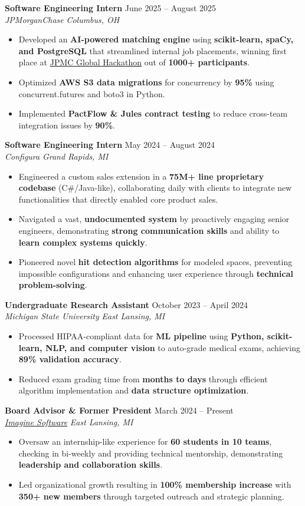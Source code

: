 \documentclass[letterpaper,11pt]{article}
\newcommand{\resumeItem}[1]{
  \item\small{
    {#1 \vspace{-2pt}}
  }
}
\newcommand{\resumeSubheading}[4]{
  \vspace{-2pt}\item
  \textbf{#1} \hfill #2 \\
  \textit{\small#3} \hfill \textit{\small #4} \\
  \vspace{-7pt} %
}
\newcommand{\resumeItemListStart}{\begin{itemize}}
\newcommand{\resumeItemListEnd}{\end{itemize}\vspace{-5pt}}
\begin{document}
    \resumeSubheading
      {Software Engineering Intern}{June 2025 -- August 2025}
      {JPMorganChase}{Columbus, OH}
    \resumeItemListStart
        \resumeItem{Developed an \textbf{AI-powered matching engine} using \textbf{scikit-learn, spaCy, and PostgreSQL} that streamlined internal job placements, winning first place at \underline{\href{https://www.linkedin.com/posts/indi-de-silva_at-jpmorganchase-our-internship-program-activity-7355579081490354177-NYLE}{JPMC Global Hackathon}} out of \textbf{1000+ participants}.}
        \resumeItem{Optimized \textbf{AWS S3 data migrations} for concurrency by \textbf{95\%} using concurrent.futures and boto3 in Python.}
        \resumeItem{Implemented \textbf{PactFlow \& Jules contract testing} to reduce cross-team integration issues by \textbf{90\%}.}
    \resumeItemListEnd

    \resumeSubheading
      {Software Engineering Intern}{May 2024 -- August 2024}
      {Configura}{Grand Rapids, MI}
      \resumeItemListStart
        \resumeItem{Engineered a custom sales extension in a \textbf{75M+ line proprietary codebase} (C\#/Java-like), collaborating daily with clients to integrate new functionalities that directly enabled core product sales.}
        \resumeItem{Navigated a vast, \textbf{undocumented system} by proactively engaging senior engineers, demonstrating \textbf{strong communication skills} and ability to \textbf{learn complex systems quickly}.}
        \resumeItem{Pioneered novel \textbf{hit detection algorithms} for modeled spaces, preventing impossible configurations and enhancing user experience through \textbf{technical problem-solving}.}
      \resumeItemListEnd

\resumeSubheading
      {Undergraduate Research Assistant}{October 2023 -- April 2024}
      {Michigan State University}{East Lansing, MI}
      \resumeItemListStart
        \resumeItem{Processed HIPAA-compliant data for \textbf{ML pipeline} using \textbf{Python, scikit-learn, NLP, and computer vision} to auto-grade medical exams, achieving \textbf{89\% validation accuracy}.}
        \resumeItem{Reduced exam grading time from \textbf{months to days} through efficient algorithm implementation and \textbf{data structure optimization}.}
      \resumeItemListEnd

      \resumeSubheading
      {Board Advisor \& Former President}{March 2024 -- Present}
      {\underline{\href{https://www.imagine-software.org/}{Imagine Software}}}{East Lansing, MI}
      \resumeItemListStart
        \resumeItem{Oversaw an internship-like experience for \textbf{60 students in 10 teams}, checking in bi-weekly and providing technical mentorship, demonstrating \textbf{leadership and collaboration skills}.}
        \resumeItem{Led organizational growth resulting in \textbf{100\% membership increase} with \textbf{350+ new members} through targeted outreach and strategic planning.}
      \resumeItemListEnd
\end{document}
